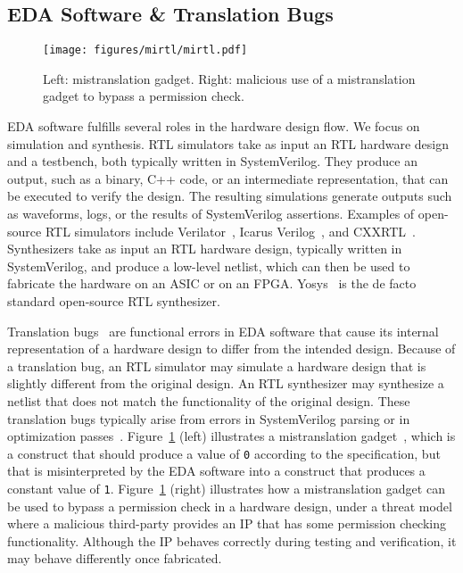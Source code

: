 \subsection{EDA Software \& Translation Bugs}
\label{sec:background:eda-software}

\begin{figure}[t]
    \begin{center}
        \texttt{[image: figures/mirtl/mirtl.pdf]}
    \end{center}
    \vspace*{-1em}
    \caption{\label{fig:background_mirtl} Left: mistranslation gadget. Right: malicious use of a mistranslation gadget to bypass a permission check.}
    \vspace*{-1.4em}
\end{figure}

EDA software fulfills several roles in the hardware design flow.
We focus on simulation and synthesis.
RTL simulators take as input an RTL hardware design and a testbench, both typically written in SystemVerilog.
They produce an output, such as a binary, C++ code, or an intermediate representation, that can be executed to verify the design.
The resulting simulations generate outputs such as waveforms, logs, or the results of SystemVerilog assertions.
Examples of open-source RTL simulators include Verilator~\cite{Snyder2024Verilator}, Icarus Verilog~\cite{icarus-verilog}, and CXXRTL~\cite{cxxrtl}.
Synthesizers take as input an RTL hardware design, typically written in SystemVerilog, and produce a low-level netlist, which can then be used to fabricate the hardware on an ASIC or on an FPGA.
Yosys~\cite{wolf2013yosys} is the de facto standard open-source RTL synthesizer.

Translation bugs~\cite{mirtl} are functional errors in EDA software that cause its internal representation of a hardware design to differ from the intended design.
Because of a translation bug, an RTL simulator may simulate a hardware design that is slightly different from the original design.
An RTL synthesizer may synthesize a netlist that does not match the functionality of the original design.
These translation bugs typically arise from errors in SystemVerilog parsing or in optimization passes~\cite{vloghammer,verismith,mirtl}.
% 
Figure~\ref{fig:background_mirtl} (left) illustrates a mistranslation gadget~\cite{mirtl}, which is a construct that should produce a value of \texttt{0} according to the specification, but that is misinterpreted by the EDA software into a construct that produces a constant value of \texttt{1}.
Figure~\ref{fig:background_mirtl} (right) illustrates how a mistranslation gadget can be used to bypass a permission check in a hardware design, under a threat model where a malicious third-party provides an IP that has some permission checking functionality.
Although the IP behaves correctly during testing and verification, it may behave differently once fabricated.

